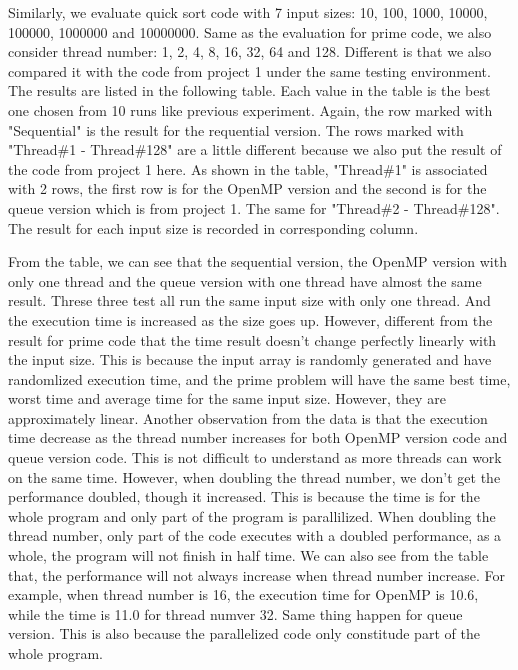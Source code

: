 \documentclass[11pt,letterpaper,oneside]{article}
\begin{document}
Similarly, we evaluate quick sort code with 7 input sizes: 10, 100, 1000, 10000, 100000, 1000000 and 10000000. Same as the evaluation for prime code, we also consider thread number: 1, 2, 4, 8, 16, 32, 64 and 128. Different is that we also compared it with the code from project 1 under the same testing environment. The results are listed in the following table. Each value in the table is the best one chosen from 10 runs like previous experiment. Again, the row marked with "Sequential" is the result for the requential version. The rows marked with "Thread\#1 - Thread\#128" are a little different because we also put the result of the code from project 1 here. As shown in the table, "Thread\#1" is associated with 2 rows, the first row is for the OpenMP version and the second is for the queue version which is from project 1. The same for "Thread\#2 - Thread\#128". The result for each input size is recorded in corresponding column.

From the table, we can see that the sequential version, the OpenMP version with only one thread and the queue version with one thread have almost the same result. Threse three test all run the same input size with only one thread. And the execution time is increased as the size goes up. However, different from the result for prime code that the time result doesn't change perfectly linearly with the input size. This is because the input array is randomly generated and have randomlized execution time, and the prime problem will have the same best time, worst time and average time for the same input size. However, they are approximately linear. Another observation from the data is that the execution time decrease as the thread number increases for both OpenMP version code and queue version code. This is not difficult to understand as more threads can work on the same time. However, when doubling the thread number, we don't get the performance doubled, though it increased. This is because the time is for the whole program and only part of the program is parallilized. When doubling the thread number, only part of the code executes with a doubled performance, as a whole, the program will not finish in half time. We can also see from the table that, the performance will not always increase when thread number increase. For example, when thread number is 16, the execution time for OpenMP is 10.6, while the time is 11.0 for thread numver 32. Same thing happen for queue version. This is also because the parallelized code only constitude part of the whole program.
\end{document}

